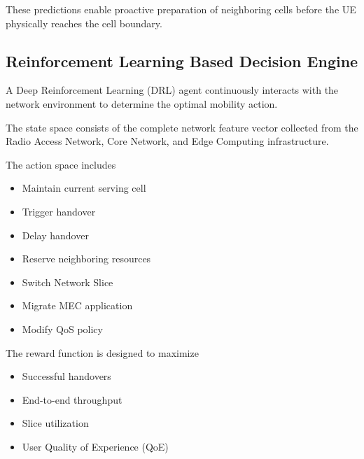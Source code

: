 \documentclass[12pt,a4paper]{article}\usepackage[a4paper,margin=1in]{geometry}\usepackage{graphicx}\usepackage{longtable}\usepackage{booktabs}\usepackage{hyperref}\usepackage{enumitem}\usepackage{amsmath}\usepackage{tikz}\usepackage{pgfgantt}\usepackage{setspace}\setstretch{1.15}\usetikzlibrary{positioning,arrows.meta,shapes.geometric}
\begin{document}
	These predictions enable proactive preparation of neighboring cells before the UE physically reaches the cell boundary.
	
	
	\subsection{Reinforcement Learning Based Decision Engine}
	
	A Deep Reinforcement Learning (DRL) agent continuously interacts with the network environment to determine the optimal mobility action.
	
	The state space consists of the complete network feature vector collected from the Radio Access Network, Core Network, and Edge Computing infrastructure.
	
	The action space includes
	
	\begin{itemize}
		
		\item Maintain current serving cell
		
		\item Trigger handover
		
		\item Delay handover
		
		\item Reserve neighboring resources
		
		\item Switch Network Slice
		
		\item Migrate MEC application
		
		\item Modify QoS policy
		
	\end{itemize}
	
	The reward function is designed to maximize
	
	\begin{itemize}
		
		\item Successful handovers
		
		\item End-to-end throughput
		
		\item Slice utilization
		
		\item User Quality of Experience (QoE)
		
	\end{itemize}
	
\end{document}
